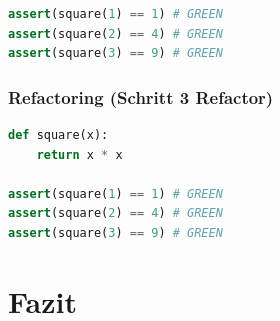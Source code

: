 \documentclass[a0,landscape]{a0poster}
\newcommand{\gqq}[1]{\glqq #1\grqq}
\begin{document}
\begin{multicols}{4}
\begin{lstlisting}[language=Python]
assert(square(1) == 1) # GREEN
assert(square(2) == 4) # GREEN
assert(square(3) == 9) # GREEN
\end{lstlisting}

\subsubsection*{Refactoring (Schritt 3 \gqq{Refactor})}
\begin{lstlisting}[language=Python]
def square(x):
    return x * x

assert(square(1) == 1) # GREEN
assert(square(2) == 4) # GREEN
assert(square(3) == 9) # GREEN
\end{lstlisting}

\color{SaddleBrown}
\section*{Fazit}


\color{DarkSlateGray}


\nocite{*} %



\end{multicols}
\end{document}
